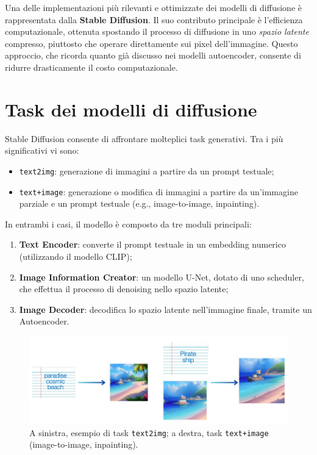 Una delle implementazioni più rilevanti e ottimizzate dei modelli di diffusione è rappresentata dalla \textbf{Stable Diffusion}. Il suo contributo principale è l’efficienza computazionale, ottenuta spostando il processo di diffusione in uno \textit{spazio latente} compresso, piuttosto che operare direttamente sui pixel dell’immagine. Questo approccio, che ricorda quanto già discusso nei modelli autoencoder, consente di ridurre drasticamente il costo computazionale.

\section{Task dei modelli di diffusione}

Stable Diffusion consente di affrontare molteplici task generativi. Tra i più significativi vi sono:
\begin{itemize}
    \item \texttt{text2img}: generazione di immagini a partire da un prompt testuale;
    \item \texttt{text+image}: generazione o modifica di immagini a partire da un’immagine parziale e un prompt testuale (e.g., image-to-image, inpainting).
\end{itemize}

In entrambi i casi, il modello è composto da tre moduli principali:
\begin{enumerate}
    \item \textbf{Text Encoder}: converte il prompt testuale in un embedding numerico (utilizzando il modello CLIP);
    \item \textbf{Image Information Creator}: un modello U-Net, dotato di uno scheduler, che effettua il processo di denoising nello spazio latente;
    \item \textbf{Image Decoder}: decodifica lo spazio latente nell’immagine finale, tramite un Autoencoder.
\end{enumerate}

\begin{figure}
    \centering
    \includegraphics[width=\textwidth]{figure/t2imgAndtextandtext}
    \caption{A sinistra, esempio di task \texttt{text2img}; a destra, task \texttt{text+image} (image-to-image, inpainting).}
    \label{fig:stabDiff}
\end{figure}

